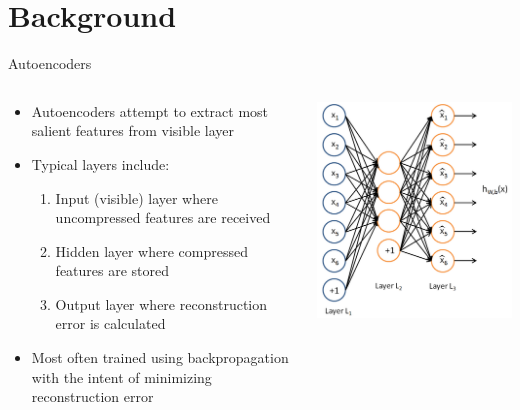 \documentclass[xcolor=dvipsnames]{beamer}
\newcommand\Fontvi{\fontsize{7}{10}\selectfont}
\begin{document}
	\section{Background}	
	\begin{frame}{Autoencoders}	
		\begin{columns}[T]
			\begin{column}{.5\textwidth}
				\begin{itemize}
					\item Autoencoders attempt to extract most salient features from visible layer	
					\item Typical layers include:
					\begin{enumerate}\Fontvi
						\item Input (visible) layer where uncompressed features are received
						\item Hidden layer where compressed features are stored
						\item Output layer where reconstruction error is calculated
					\end{enumerate}
					\item Most often trained using backpropagation with the intent of minimizing reconstruction error
				\end{itemize}
			\end{column}
	
			\begin{column}{.5\textwidth}
				\includegraphics[width=\textwidth]{ExampleAutoencoder}
			\end{column}
		\end{columns}
	\end{frame}
	
\end{document}
